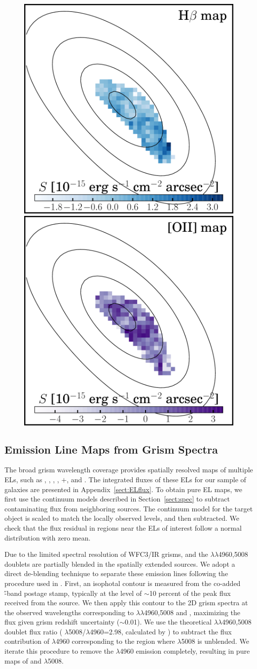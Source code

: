 \begin{figure}
    \includegraphics[width=.161\textwidth]{fig_combELmaps/id07255_Hb.pdf}
    \includegraphics[width=.161\textwidth]{fig_combELmaps/id07255_OII.pdf}
\end{figure}

\subsection{Emission Line Maps from Grism Spectra}\label{subsect:combELmaps}

The broad grism wavelength coverage provides spatially resolved maps of multiple ELs,
such as \OII, \Hg, \Hb, \OIII, \Ha$+$\NII, and \SII.
The integrated fluxes of these ELs for our sample of galaxies are presented in Appendix~\ref{sect:ELflux}.
To obtain pure EL maps, we first use the \axe continuum models described in Section~\ref{sect:spec} to subtract contaminating
flux from neighboring sources. The continuum model for the target object is scaled to match
the locally observed levels, and then subtracted. We check that the flux residual in regions
near the ELs of interest follow a normal distribution with zero mean.

Due to the limited spectral resolution of \hst WFC3/IR grisms, \Hb and the \OIII$\lambda\lambda$4960,5008 doublets are
partially blended in the spatially extended sources. We adopt a direct de-blending technique
to separate these emission lines following the procedure used in \citet{2015AJ....149..107J}.
First, an isophotal contour is measured from the co-added \hst \H-band postage stamp,
typically at the level of $\sim$10 percent of the peak flux received from the source.
We then apply this contour to the 2D grism spectra at the observed wavelengths corresponding to
\OIII$\lambda\lambda$4960,5008 and \Hb, maximizing the flux given grism redshift uncertainty ($\sim$0.01).
We use the theoretical \OIII$\lambda\lambda$4960,5008 doublet flux ratio (\ie
\OIII$\lambda$5008/\OIII$\lambda$4960=2.98, calculated by \citet{Storey:2000jd}) to subtract
the flux contribution of \OIII$\lambda$4960 corresponding to the region where
\OIII$\lambda$5008 is unblended. We iterate this procedure to remove the \OIII$\lambda$4960
emission completely, resulting in pure maps of \Hb and \OIII$\lambda$5008.

